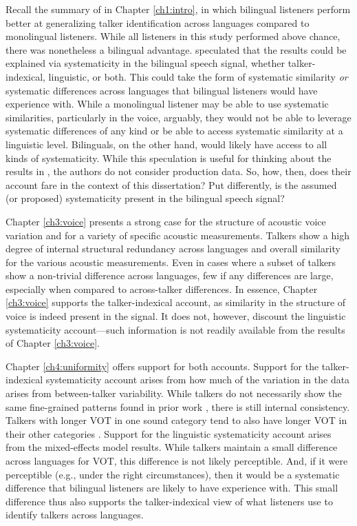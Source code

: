 Recall the summary of \citet{orena_2019_identifying} in Chapter \ref{ch1:intro}, in which bilingual listeners perform better at generalizing talker identification across languages compared to monolingual listeners. While all listeners in this study performed above chance, there was nonetheless a bilingual advantage. \citeauthor{orena_2019_identifying} speculated that the results could be explained via systematicity in the bilingual speech signal, whether talker-indexical, linguistic, or both. This could take the form of systematic similarity \textit{or} systematic differences across languages that bilingual listeners would have experience with. While a monolingual listener may be able to use systematic similarities, particularly in the voice, arguably, they would not be able to leverage systematic differences of any kind or be able to access systematic similarity at a linguistic level. Bilinguals, on the other hand, would likely have access to all kinds of systematicity. While this speculation is useful for thinking about the results in \citet{orena_2019_identifying}, the authors do not consider production data. So, how, then, does their account fare in the context of this dissertation? Put differently, is the assumed (or proposed) systematicity present in the bilingual speech signal? 

Chapter \ref{ch3:voice} presents a strong case for the structure of acoustic voice variation and for a variety of specific acoustic measurements. Talkers show a high degree of internal structural redundancy across languages and overall similarity for the various acoustic measurements. Even in cases where a subset of talkers show a non-trivial difference across languages, few if any differences are large, especially when compared to across-talker differences. In essence, Chapter \ref{ch3:voice} supports the talker-indexical account, as similarity in the structure of voice is indeed present in the signal. It does not, however, discount the linguistic systematicity account---such information is not readily available from the results of Chapter \ref{ch3:voice}.

Chapter \ref{ch4:uniformity} offers support for both accounts. Support for the talker-indexical systematicity account arises from how much of the variation in the data arises from between-talker variability. While talkers do not necessarily show the same fine-grained patterns found in prior work \citep[e.g.,][]{chodroff_2017_structure}, there is still internal consistency. Talkers with longer VOT in one sound category tend to also have longer VOT in their other categories \citep[for a similar conclusion regarding speech rate, see][]{bradlow_2017_rate}. Support for the linguistic systematicity account arises from the mixed-effects model results. While talkers maintain a small difference across languages for VOT, this difference is not likely perceptible. And, if it were perceptible (e.g., under the right circumstances), then it would be a systematic difference that bilingual listeners are likely to have experience with. This small difference thus also supports the talker-indexical view of what listeners use to identify talkers across languages.

